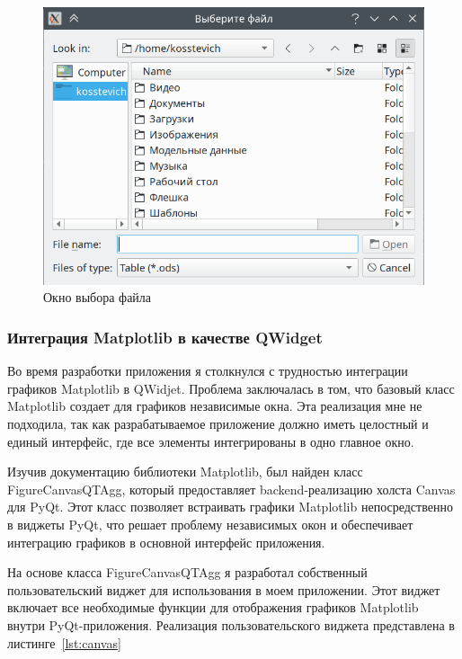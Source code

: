 \begin{figure}[H]
	\centering
	\includegraphics[width=1\linewidth]{pics/ris7} %
	\caption{Окно выбора файла}
	\label{fig:ris7} %
\end{figure}

\subsubsection{Интеграция Matplotlib в качестве QWidget}

Во время разработки приложения я столкнулся с трудностью интеграции графиков Matplotlib в QWidjet. Проблема заключалась в том, что базовый класс Matplotlib создает для графиков независимые окна. Эта реализация мне не подходила, так как разрабатываемое приложение должно иметь целостный и единый интерфейс, где все элементы интегрированы в одно главное окно.

Изучив документацию библиотеки Matplotlib, был найден класс Figu\-reCanvasQTAgg, который предоставляет backend-реализацию холста Canvas для PyQt. Этот класс позволяет встраивать графики Matplotlib непосредственно в виджеты PyQt, что решает проблему независимых окон и обеспечивает интеграцию графиков в основной интерфейс приложения.

На основе класса FigureCanvasQTAgg я разработал собственный пользовательский виджет для использования в моем приложении. Этот виджет включает все необходимые функции для отображения графиков Matplotlib внутри PyQt-приложения. Реализация пользовательского виджета представлена в листинге~\ref{lst:canvas}

